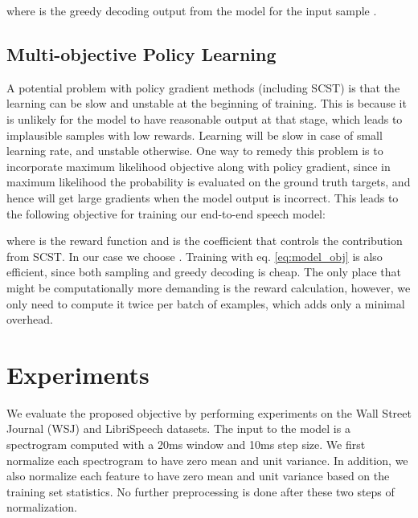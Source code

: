 \documentclass{article}
\begin{document}
where  is the greedy decoding output from the model for the input sample .



\subsection{Multi-objective Policy Learning}
A potential problem with policy gradient methods (including SCST) is that the learning can be slow and unstable at the beginning of training. This is because it is unlikely for the model to have reasonable output at that stage, which leads to implausible samples with low rewards. Learning will be slow in case of small learning rate, and unstable otherwise. One way to remedy this problem is to incorporate maximum likelihood objective along with policy gradient, since in maximum likelihood the probability is evaluated on the ground truth targets, and hence will get large gradients when the model output is incorrect. This leads to the following objective for training our end-to-end speech model:

where  is the reward function and  is the coefficient that controls the contribution from SCST. In our case we choose . Training with eq. \ref{eq:model_obj} is also efficient, since both sampling and greedy decoding is cheap. The only place that might be computationally more demanding is the reward calculation, however, we only need to compute it twice per batch of examples, which adds only a minimal overhead.


\section{Experiments}
\label{sec:exp}
We evaluate the proposed objective by performing experiments on the Wall Street Journal (WSJ) and LibriSpeech \cite{panayotov2015librispeech} datasets. The input to the model is a spectrogram computed with a 20ms window and 10ms step size.
We first normalize each spectrogram to have zero mean and unit variance. In addition, we also normalize each feature to have zero mean and unit variance based on the training set statistics. No further preprocessing is done after these two steps of normalization. 
\end{document}
